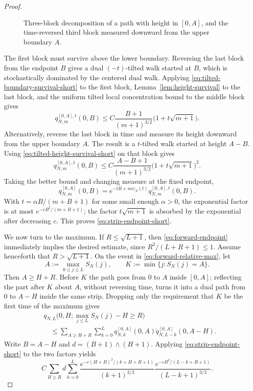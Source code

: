 \documentclass[11pt]{article}
\theoremstyle{plain}
\theoremstyle{definition}
\theoremstyle{remark}
\begin{document}
\begin{proof}
\begin{figure}[ht]
{\begin{tikzpicture}
\end{tikzpicture}}
\caption{Three-block decomposition of a path with height in
\([0,A]\), and the time-reversed third block measured downward from the
upper boundary \(A\).}
\label{fig:three-block-strip}
\end{figure} The first block
must survive above the lower boundary.  Reversing the last block from
the endpoint \(B\) gives a dual \((-t)\)-tilted walk started at \(B\),
which is stochastically dominated by the centered dual walk.  Applying
\eqref{eq:tilted-boundary-survival-short} to the first block,
Lemma~\ref{lem:height-survival} to the last block, and the uniform tilted
local concentration bound to the middle block gives
\[
 q_{N,m}^{[0,A],t}(0,B)
 \le C\frac{B+1}{(m+1)^{3/2}}
       \bigl(1+t\sqrt{m+1}\bigr).
\]
Alternatively, reverse the last block in time and measure its height
downward from the upper boundary \(A\).  The
result is a \(t\)-tilted walk started at height \(A-B\).  Using
\eqref{eq:tilted-height-survival-short} on that block gives
\[
 q_{N,m}^{[0,A],t}(0,B)
 \le C\frac{A-B+1}{(m+1)^{3/2}}
       \bigl(1+t\sqrt{m+1}\bigr)^2.
\]
Taking the better bound and changing measure at the fixed endpoint,
\[
 q_{N,m}^{[0,A]}(0,B)
 =e^{-tB+m\psi_N(t)}q_{N,m}^{[0,A],t}(0,B).
\]
With \(t=\alpha B/(m+B+1)\) for some small enough $\alpha>0$, the exponential factor is at most
\(e^{-cB^2/(m+B+1)}\); the factor
\(t\sqrt{m+1}\) is absorbed by the exponential after decreasing \(c\).  This proves
\eqref{eq:strip-endpoint-short}.

We now turn to the maximum.  If \(R\le\sqrt{L+1}\), then
\eqref{eq:forward-endpoint} immediately implies the desired estimate,
since \(R^2/(L+R+1)\le1\).  Assume henceforth that
\(R>\sqrt{L+1}\).  On the event in
\eqref{eq:forward-relative-max}, let
\[
 A:=\max_{0\le j\le L}S_N(j),
 \qquad K:=\min\{j:S_N(j)=A\}.
\]
Then \(A\ge H+R\).  Before \(K\) the path goes from \(0\) to \(A\)
inside \([0,A]\); reflecting the part after \(K\) about \(A\), without
reversing time, turns it into a dual path from \(0\) to \(A-H\) inside
the same strip.  Dropping only the requirement that \(K\) be the first time of
the maximum gives
{
\begin{equation*}
 \begin{split}
 &q_{N,L}\bigl(0,H;\max_{j\le L}S_N(j)-H\ge R\bigr)\\
 &\quad\le
 \sum_{A\ge H+R}\sum_{k=0}^{L}
 q_{N,k}^{[0,A]}(0,A)
 \check q_{N,L-k}^{[0,A]}(0,A-H).
 \end{split}
\end{equation*}}
Write \(B=A-H\) and
\(d=(B+1)\wedge(H+1)\).  Applying
\eqref{eq:strip-endpoint-short} to the two factors yields
\begin{equation}
 C\sum_{B\ge R}d\sum_{k=0}^{L}
 \frac{
 e^{-c(H+B)^2/(k+H+B+1)}
 }
 {(k+1)^{3/2}}\frac{e^{-cB^2/(L-k+B+1)}}{(L-k+1)^{3/2}}.
 \label{eq:max-double-sum-short}
\end{equation}


\end{proof}
\end{document}
